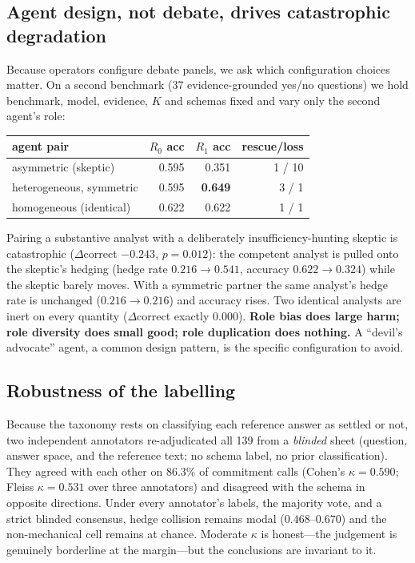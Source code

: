 \documentclass[sigconf,anonymous,review]{acmart}
\begin{document}
\subsection{Agent design, not debate, drives catastrophic degradation}

Because operators configure debate panels, we ask which configuration
choices matter. On a second benchmark (37 evidence-grounded yes/no questions)
we hold benchmark, model, evidence, $K$ and schemas fixed and vary only the
second agent's role:

\begin{center}
\small
\begin{tabular}{lrrr}
\toprule
agent pair & $R_0$ acc & $R_1$ acc & rescue/loss \\
\midrule
asymmetric (skeptic)     & 0.595 & 0.351 & 1 / 10 \\
heterogeneous, symmetric & 0.595 & \textbf{0.649} & 3 / 1 \\
homogeneous (identical)  & 0.622 & 0.622 & 1 / 1 \\
\bottomrule
\end{tabular}
\end{center}

Pairing a substantive analyst with a deliberately insufficiency-hunting
skeptic is catastrophic ($\Delta$correct $-0.243$, $p{=}0.012$): the competent
analyst is pulled onto the skeptic's hedging (hedge rate $0.216 \rightarrow
0.541$, accuracy $0.622 \rightarrow 0.324$) while the skeptic barely moves.
With a symmetric partner the same analyst's hedge rate is unchanged
($0.216 \rightarrow 0.216$) and accuracy rises. Two identical analysts are
inert on every quantity ($\Delta$correct exactly $0.000$). \textbf{Role bias
does large harm; role diversity does small good; role duplication does
nothing.} A ``devil's advocate'' agent, a common design pattern, is the
specific configuration to avoid.

\subsection{Robustness of the labelling}
\label{sec:robust}

Because the taxonomy rests on classifying each reference answer as settled or
not, two independent annotators re-adjudicated all 139 from a \emph{blinded}
sheet (question, answer space, and the reference text; no schema label, no
prior classification). They agreed with each other on $86.3\%$ of commitment
calls (Cohen's $\kappa = 0.590$; Fleiss $\kappa = 0.531$ over three
annotators) and disagreed with the schema in opposite directions. Under every
annotator's labels, the majority vote, and a strict blinded consensus, hedge
collision remains modal ($0.468$--$0.670$) and the non-mechanical cell remains
at chance. Moderate $\kappa$ is honest---the judgement is genuinely
borderline at the margin---but the conclusions are invariant to it.
\end{document}
